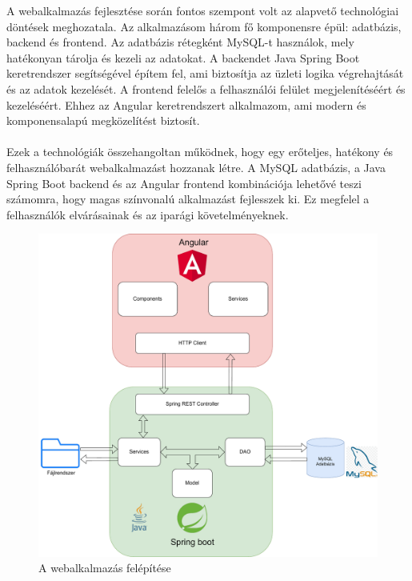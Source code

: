 




A webalkalmazás fejlesztése során fontos szempont volt az alapvető technológiai döntések meghozatala. Az alkalmazásom három fő komponensre épül: adatbázis, backend és frontend. Az adatbázis rétegként MySQL-t\cite{MySQL} használok, mely hatékonyan tárolja és kezeli az adatokat. A backendet Java Spring Boot\cite{spring_boot} keretrendszer segítségével építem fel, ami biztosítja az üzleti logika végrehajtását és az adatok kezelését. A frontend felelős a felhasználói felület megjelenítéséért és kezeléséért. Ehhez az Angular\cite{angular} keretrendszert alkalmazom, ami modern és komponensalapú megközelítést biztosít.\\
\\
Ezek a technológiák összehangoltan működnek, hogy egy erőteljes, hatékony és felhasználóbarát webalkalmazást hozzanak létre. A MySQL\cite{MySQL} adatbázis, a Java Spring Boot\cite{spring_boot} backend és az Angular\cite{angular} frontend kombinációja lehetővé teszi számomra, hogy magas színvonalú alkalmazást fejlesszek ki. Ez megfelel a felhasználók elvárásainak és az iparági követelményeknek.

\begin{figure}[h]
\centering
\includegraphics[width=\textwidth]{images/A_webalkalmazás_felépítése.pdf}
\caption{A webalkalmazás felépítése}
\label{fig:felepites}
\end{figure}


